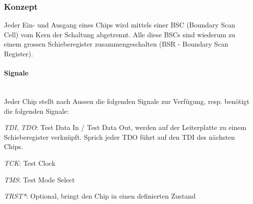 \begin{multicols}{2}
    \subsubsection{Konzept}
    Jeder Ein- und Ausgang eines Chips wird mittels einer BSC (Boundary Scan Cell) vom Kern der Schaltung abgetrennt. Alle diese BSCs sind wiederum zu einem grossen Schieberegister zusammengeschalten (BSR - Boundary Scan Register).

    \paragraph{Signale}$~$ \\
    Jeder Chip stellt nach Aussen die folgenden Signale zur Verfügung, resp. benötigt die folgenden Signale:
    \begin{compactitem}
        \item \textit{TDI}, \textit{TDO}: Test Data In / Test Data Out, werden auf der Leiterplatte zu einem Schieberegister verknüpft. Sprich jeder TDO führt auf den TDI des nächsten Chips.
        \item \textit{TCK}: Test Clock
        \item \textit{TMS}: Test Mode Select
        \item \textit{TRST*}: Optional, bringt den Chip in einen definierten Zustand
    \end{compactitem}


\end{multicols}
